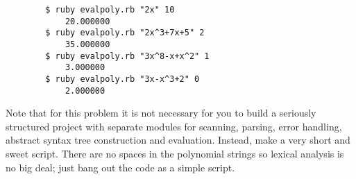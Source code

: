\documentclass{article}
\begin{document}
\begin{enumerate}
    \begin{verbatim}
        $ ruby evalpoly.rb "2x" 10
            20.000000
        $ ruby evalpoly.rb "2x^3+7x+5" 2
            35.000000
        $ ruby evalpoly.rb "3x^8-x+x^2" 1
            3.000000
        $ ruby evalpoly.rb "3x-x^3+2" 0
            2.000000
    \end{verbatim}
    Note that for this problem it is not necessary for you to build a seriously structured project with separate modules for scanning, parsing, error handling, abstract syntax tree construction and evaluation. Instead, make a very short and sweet script. There are no spaces in the polynomial strings so lexical analysis is no big deal; just bang out the code as a simple script. \\
    \pagebreak
\end{enumerate}
\end{document}
